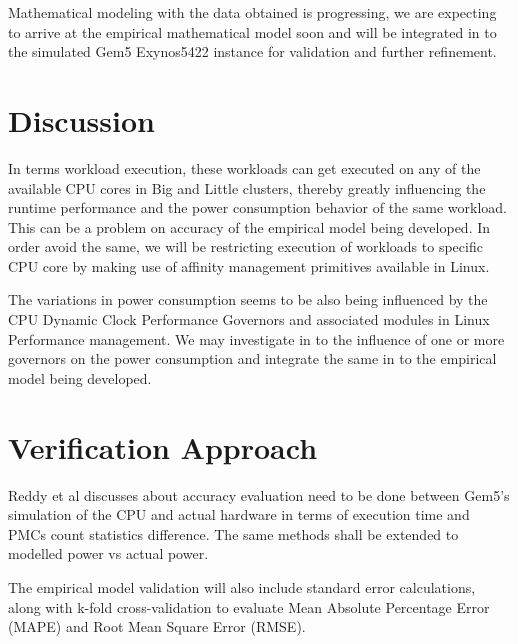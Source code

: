 \documentclass[conference]{IEEEtran}
\begin{document}
    \par Mathematical modeling with the data obtained is progressing, we are expecting to arrive at the empirical mathematical model soon and will be integrated in to the simulated Gem5 Exynos5422 instance for validation and further refinement.
    \medbreak
\section{Discussion}
    \par In terms workload execution, these workloads can get executed on any of the available CPU cores in Big and Little clusters, thereby greatly influencing the runtime performance and the power consumption behavior of the same workload. This can be a problem on accuracy of the empirical model being developed. In order avoid the same, we will be restricting execution of workloads to specific CPU core by making use of affinity management primitives available in Linux.

    \par The variations in power consumption seems to be also being influenced by the CPU Dynamic Clock Performance Governors \cite{10.1145/3167132.3167198} and associated modules in Linux Performance management. We may investigate in to the influence of one or more governors on the power consumption and integrate the same in to the empirical model being developed.
    \medbreak

\section{Verification Approach}
    \par Reddy et al \cite{Reddy2017EmpiricalCP} discusses about accuracy evaluation need to be done between Gem5's simulation of the CPU and actual hardware in terms of execution time and PMCs count statistics difference. The same methods shall be extended to modelled power vs actual power. \par The empirical model validation will also include standard error calculations, along with k-fold cross-validation to evaluate Mean Absolute Percentage Error (MAPE) and Root Mean Square Error (RMSE).
    
\end{document}
